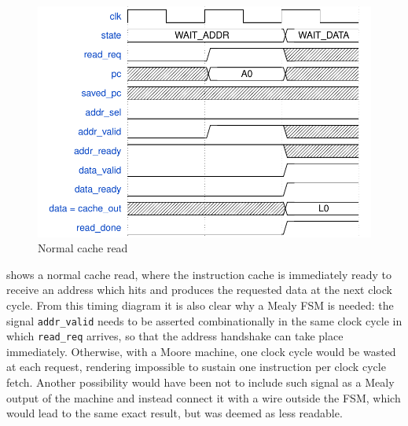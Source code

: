 \begin{figure}[hbt]
  \centering
  \includegraphics{img/cache01.pdf}
  \caption{Normal cache read}
  \label{fig:cache01}
\end{figure}
 shows a normal cache read, where the instruction cache is immediately ready to receive an address which hits and produces the requested data at the next clock cycle. From this timing diagram it is also clear why a Mealy \acs{FSM} is needed: the signal \texttt{addr\_valid} needs to be asserted combinationally in the same clock cycle in which \texttt{read\_req} arrives, so that the address handshake can take place immediately. Otherwise, with a Moore machine, one clock cycle would be wasted at each request, rendering impossible to sustain one instruction per clock cycle fetch. Another possibility would have been not to include such signal as a Mealy output of the machine and instead connect it with a wire outside the \acs{FSM}, which would lead to the same exact result, but was deemed as less readable.

